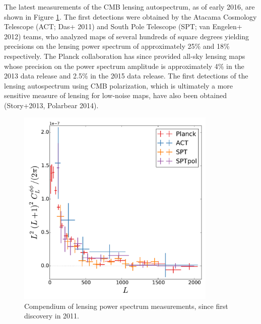 The latest measurements of the CMB lensing autospectrum, as of early 2016, are shown in Figure \ref{CMBLensPower}. The first detections were obtained by the Atacama Cosmology Telescope (ACT; Das+ 2011) and South Pole Telescope  (SPT; van Engelen+ 2012) teams, who analyzed maps of several hundreds of square degrees yielding precisions on the lensing power spectrum of approximately 25\% and 18\% respectively.  The Planck collaboration has since provided all-sky lensing maps whose precision on the power spectrum amplitude is approximately 4\% in the 2013 data release and 2.5\% in the 2015 data release.  The first detections of the lensing autospectrum using CMB polarization, which is ultimately a more sensitive measure of lensing for low-noise maps,  have also been obtained (Story+2013, Polarbear 2014).

\begin{figure}[htbp]
\centering
\includegraphics[width=0.85\textwidth]{CMBLensing/autoCompilation}
\caption{Compendium of lensing power spectrum measurements, since first discovery in 2011.  }
\label{CMBLensPower}
\end{figure}

